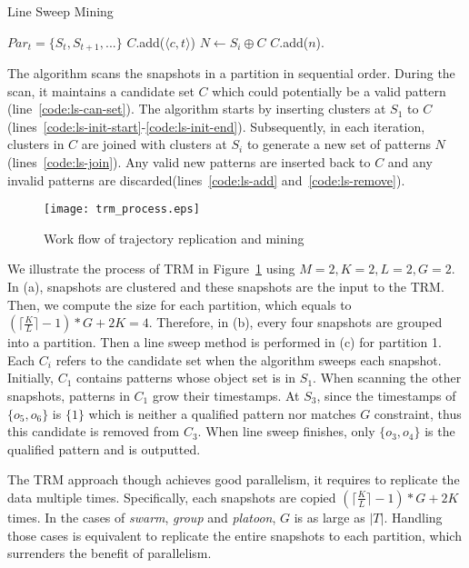 \begin{algorithm}
\caption{Line Sweep Mining}
\label{algo:line-sweep}
\begin{algorithmic}[1]
\Require $Par_t = \{S_t, S_{t+1}, ...\}$
  \label{code:ls-can-set}
\label{code:ls-init-start}
\State $C$.add($\langle c, t \rangle $)
\EndFor
\label{code:ls-init-end}
\State $N \gets S_i \oplus C$ \label{code:ls-join}
			$C$.add($n$).
			\label{code:ls-add}
		\EndIf
	\EndFor
{}
	\label{code:ls-remove}
\EndFor
{}
\end{algorithmic}
\end{algorithm}

The algorithm scans the snapshots in a partition in sequential order. During the scan, it
maintains a candidate set $C$ which could potentially be a valid pattern (line~\ref{code:ls-can-set}).
The algorithm starts by inserting clusters at $S_1$ to $C$ (lines~\ref{code:ls-init-start}-\ref{code:ls-init-end}).
Subsequently, in each iteration, clusters in $C$ are joined with clusters at $S_i$ to generate
a new set of patterns $N$(lines~\ref{code:ls-join}). Any valid new patterns are inserted back to $C$
and any invalid patterns are discarded(lines~\ref{code:ls-add} and~\ref{code:ls-remove}).

\begin{figure}[h]
\centering
\texttt{[image: trm\_process.eps]}
\caption{Work flow of trajectory replication and mining}
\label{fig:trm_process}
\end{figure}

\begin{example}
We illustrate the process of TRM in Figure~\ref{fig:trm_process} using $M=2, K=2, L = 2, G=2$. In (a), snapshots are clustered and these snapshots are the input to the TRM. Then, we compute the size 
for each partition, which equals to $(\lceil \frac{K}{L} \rceil-1) *G+2K = 4$. Therefore, in (b), every four snapshots
are grouped into a partition. Then a line sweep method is performed in (c) for partition 1. Each
$C_i$ refers to the candidate set  when the algorithm sweeps each snapshot. Initially, $C_1$ contains
patterns whose object set is in $S_1$. When scanning the other snapshots, patterns in $C_1$ grow
their timestamps. At $S_3$, since the timestamps of $\{o_5,o_6\}$ is $\{1\}$ which is neither
a qualified pattern nor matches $G$ constraint, thus this candidate is removed from $C_3$. When line
sweep finishes, only $\{o_3,o_4\}$ is the qualified pattern and is outputted.
\end{example}


The TRM approach though achieves good parallelism, 
it requires to replicate the data multiple times. 
Specifically, each snapshots are copied $(\lceil \frac{K}{L} \rceil -1) *G+2K$ times. 
In the cases of \emph{swarm}, \emph{group} and \emph{platoon}, $G$ is as large as $|T|$. 
Handling those cases is equivalent to replicate the entire snapshots to each partition, 
which surrenders the benefit of parallelism.

